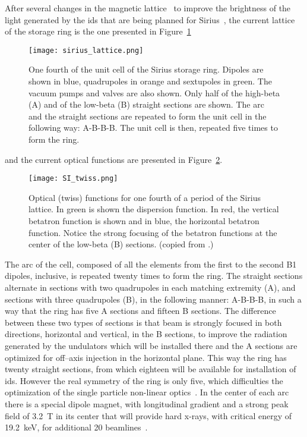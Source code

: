     After several changes in the magnetic lattice~\cite{Liu2014,Liu2015,Liu2016} to improve the brightness of the light generated by the \glspl{id} that are being planned for Sirius~\cite{Sirius2013,Vilela2017}, the current lattice of the storage ring is the one presented in Figure~\ref{fig:sirius_lattice}
    \begin{figure}
        \centering
        \texttt{[image: sirius\_lattice.png]}
        \caption[One fourth of the unit cell of the Sirius storage ring.]{One fourth of the unit cell of the Sirius storage ring. Dipoles are shown in blue, quadrupoles in orange and sextupoles in green. The vacuum pumps and valves are also shown. Only half of the high-beta (A) and of the low-beta (B) straight sections are shown. The arc and the straight sections are repeated to form the unit cell in the following way: A-B-B-B. The unit cell is then, repeated five times to form the ring.}
        \label{fig:sirius_lattice}
    \end{figure}
    and the current optical functions are presented in Figure~\ref{fig:sirius_twiss}.
    \begin{figure}
        \centering
        \texttt{[image: SI\_twiss.png]}
        \caption[Twiss functions of the Sirius storage ring.]{Optical (twiss) functions for one fourth of a period of the Sirius lattice. In green is shown the dispersion function. In red, the vertical betatron function is shown and in blue, the horizontal betatron function. Notice the strong focusing of the betatron functions at the center of the low-beta (B) sections. (copied from .)}
        \label{fig:sirius_twiss}
    \end{figure}
    The arc of the cell, composed of all the elements from the first to the second B1 dipoles, inclusive, is repeated twenty times to form the ring. The straight sections alternate in sections with two quadrupoles in each matching extremity (A), and sections with three quadrupoles (B), in the following manner: A-B-B-B, in such a way that the ring has five A sections and fifteen B sections. The difference between these two types of sections is that beam is strongly focused in both directions, horizontal and vertical, in the B sections, to improve the radiation generated by the undulators which will be installed there and the A sections are optimized for off--axis injection in the horizontal plane. This way the ring has twenty straight sections, from which eighteen will be available for installation of \glspl{id}. However the real symmetry of the ring is only five, which difficulties the optimization of the single particle non-linear optics~\cite{Sa2016, Dester2017}. In the center of each arc there is a special dipole magnet, with longitudinal gradient and a strong peak field of \SI{3.2}{\tesla} in its center that will provide hard x-rays, with critical energy of \SI{19.2}{\kilo\electronvolt}, for additional 20 beamlines~\cite{Liu2016,Sirius2013}.

